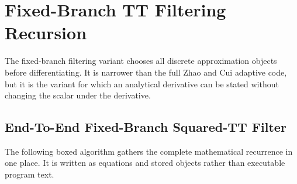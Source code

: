 \documentclass[11pt]{article}
\numberwithin{equation}{section}
\begin{document}
\section{Fixed-Branch TT Filtering Recursion}

The fixed-branch filtering variant chooses all discrete approximation objects
before differentiating.  It is narrower than the full Zhao and Cui \cite{zhao2024ttsequential} adaptive code,
but it is the variant for which an analytical derivative can be stated without
changing the scalar under the derivative.

\subsection{End-To-End Fixed-Branch Squared-TT Filter}

The following boxed algorithm gathers the complete mathematical recurrence in one
place.  It is written as equations and stored objects rather than executable
program text.
\end{document}
